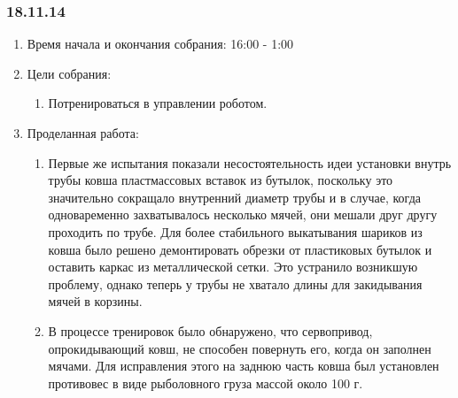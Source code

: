 \subsubsection{18.11.14}

\begin{enumerate}
	\item Время начала и окончания собрания:
	16:00 - 1:00
	\item Цели собрания:
	\begin{enumerate}
	  \item Потренироваться в управлении роботом.
	  
    \end{enumerate}
	\item Проделанная работа:
	\begin{enumerate}
	  \item Первые же испытания показали несостоятельность идеи установки внутрь трубы ковша пластмассовых вставок из бутылок, поскольку это значительно сокращало внутренний диаметр трубы и в случае, когда одноваременно захватывалось несколько мячей, они мешали друг другу проходить по трубе. Для более стабильного выкатывания шариков из ковша было решено демонтировать обрезки от пластиковых бутылок и оставить каркас из металлической сетки. Это устранило возникшую проблему, однако теперь у трубы не хватало длины для закидывания мячей в корзины.
      
      \item В процессе тренировок было обнаружено, что сервопривод, опрокидывающий ковш, не способен повернуть его, когда он заполнен мячами. Для исправления этого на заднюю часть ковша был установлен противовес в виде рыболовного груза массой около 100 г.
      

\end{enumerate}
\end{enumerate}
